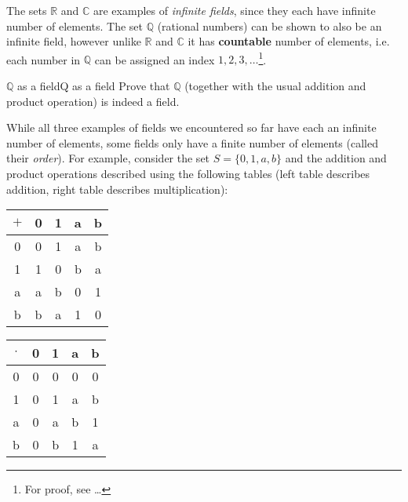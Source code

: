 The sets $\mathbb{R}$ and $\mathbb{C}$ are examples of \emph{infinite fields}, since they each have infinite number of elements. The set $\mathbb{Q}$ (rational numbers) can be shown to also be an infinite field, however unlike $\mathbb{R}$ and $\mathbb{C}$ it has \textbf{countable} number of elements, i.e. each number in $\mathbb{Q}$ can be assigned an index $1,2,3,\dots$\footnote{For proof, see \ldots}.

\begin{challange}{$\bm{\mathbb{Q}}$ as a field}{Q as a field}
	Prove that $\mathbb{Q}$ (together with the usual addition and product operation) is indeed a field.
\end{challange}

While all three examples of fields we encountered so far have each an infinite number of elements, some fields only have a finite number of elements (called their \emph{order}). For example, consider the set $S=\{0,1,a,b\}$ and the addition and product operations described using the following tables (left table describes addition, right table describes multiplication):

\centering
\begin{tabular}[]{c|cccc}
	$+$ & 0 & 1 & a & b\\
	\hline
        \rule{0em}{2.65ex}%
	0 & 0 & 1 & a & b\\
	1 & 1 & 0 & b & a\\
	a & a & b & 0 & 1\\
	b & b & a & 1 & 0\\
\end{tabular}\hspace{2cm}
\begin{tabular}[]{c|cccc}
	$\cdot$ & 0 & 1 & a & b\\
	\hline
        \rule{0em}{2.65ex}%
	0 & 0 & 0 & 0 & 0\\
	1 & 0 & 1 & a & b\\
	a & 0 & a & b & 1\\
	b & 0 & b & 1 & a\\
\end{tabular}


